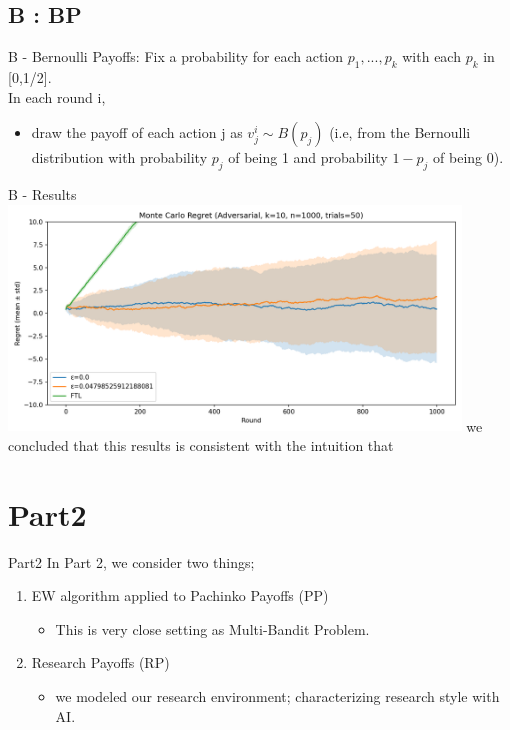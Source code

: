 \documentclass{beamer}
\begin{document}
\subsection{B : BP}

\begin{frame}{B - Bernoulli Payoffs:}
    Fix a probability for each action $p_{1},...,p_{k}$ with each $p_{k}$ in [0,1/2].\\
    In each round i,
    \begin{itemize}
        \item draw the payoff of each action j as $v^{i}_{j} \sim B(p_{j})$ (i.e, from the Bernoulli distribution with probability $p_j$ of being 1 and probability $1-p_{j}$ of being 0).
    \end{itemize}
\end{frame}

\begin{frame}{B - Results}
    \includegraphics[width=0.9\textwidth]{figures/adv_mc_regret.png}
    we concluded that this results is consistent with the intuition that 
\end{frame}


\section{Part2}

\begin{frame}{Part2}
In Part 2, we consider two things;
\begin{enumerate}
    \item EW algorithm applied to Pachinko Payoffs (PP)
    \begin{itemize}
        \item This is very close setting as Multi-Bandit Problem.
    \end{itemize}
    \item Research Payoffs (RP)
    \begin{itemize}
        \item we modeled our research environment; characterizing research style with AI.
    \end{itemize}
\end{enumerate}
    
\end{frame}
\end{document}
